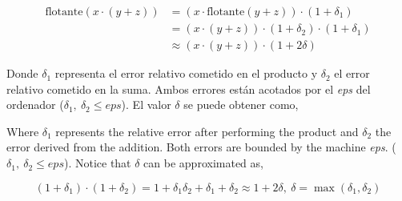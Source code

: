 \begin{align*}
\text{flotante}\left(x\cdot (y+z)\right)& =\left(x\cdot\text{flotante}(y+z)\right)\cdot(1+\delta_1)\\
 & = (x\cdot(y+z))\cdot(1+\delta_2)\cdot(1+\delta_1)\\
 & \approx (x\cdot(y+z))\cdot(1+2\delta)
\end{align*}

\begin{paracol}{2}
Donde $\delta_1$ representa el error relativo cometido en el producto y $\delta_2$ el error relativo cometido en la suma. Ambos errores están acotados por el \emph{eps} del ordenador ($\delta_1, \ \delta_2 \leq eps$). El valor $\delta$ se puede obtener como,

\switchcolumn
Where $\delta_1$ represents the relative error after performing the product and $\delta_2$ the error derived from the addition. Both errors are bounded by the machine \emph{eps}. ($\delta_1, \ \delta_2 \leq eps$). Notice that $\delta$ can be approximated as, 
\end{paracol}

\begin{equation*}
(1+\delta_1)\cdot(1+\delta_2)=1+\delta_1\delta_2+\delta_1+\delta_2\approx 1+2\delta,\ \delta=\max(\delta_1,\delta_2)
\end{equation*}

